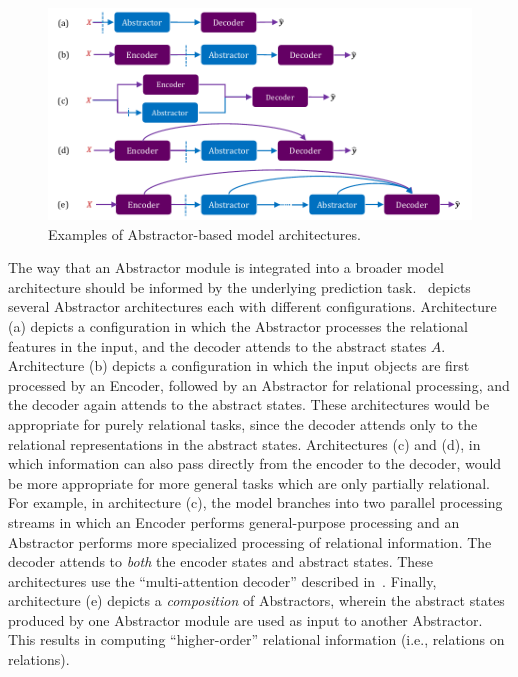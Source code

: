 \begin{figure}
    \centering
    \includegraphics[width=.8\textwidth]{figures/abstractor_architectures.pdf}
    \caption{Examples of Abstractor-based model architectures.}\label{fig:abstractor_architectures}
    \vskip-10pt
\end{figure}


The way that an Abstractor module is integrated into a broader model architecture should be informed by the underlying prediction task.~ depicts several Abstractor architectures each with different configurations. Architecture (a) depicts a configuration in which the Abstractor processes the relational features in the input, and the decoder attends to the abstract states $A$. Architecture (b) depicts a configuration in which the input objects are first processed by an Encoder, followed by an Abstractor for relational processing, and the decoder again attends to the abstract states. These architectures would be appropriate for purely relational tasks, since the decoder attends only to the relational representations in the abstract states. Architectures (c) and (d), in which information can also pass directly from the encoder to the decoder, would be more appropriate for more general tasks which are only partially relational. For example, in architecture (c), the model branches into two parallel processing streams in which an Encoder performs general-purpose processing and an Abstractor performs more specialized processing of relational information.
The decoder attends to \textit{both} the encoder states and abstract states.
These architectures use the ``multi-attention decoder'' described in~.
Finally, architecture (e) depicts a \textit{composition} of Abstractors, wherein the abstract states produced by one Abstractor module are used as input to another Abstractor. This results in computing ``higher-order'' relational information (i.e., relations on relations).

